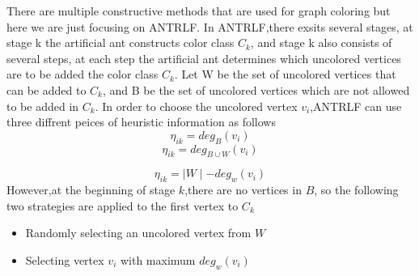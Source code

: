 \documentclass[a4paper]{article}
\begin{document}
There are multiple constructive methods that are used for graph coloring but here we are just focusing on ANTRLF. In ANTRLF,there exsits several stages, at stage k the artificial ant constructs color class $C_k$, and stage k also consists of several steps, at each step the artificial ant determines which uncolored vertices are to be added the color class $C_k$. Let W be the set of uncolored vertices that can be added to $C_k$, and B be the set 
of uncolored vertices which are not allowed to be added in $C_k$. In order to choose the uncolored vertex $v_i$,ANTRLF can use three diffrent peices of heuristic information as follows
\begin{equation}
\eta_{ik} = deg_{B}(v_i)  
\label{eqn:strat1}  
\end{equation}
\begin{equation}
    \eta_{ik} = deg_{B \cup W}(v_i)
    \label{eqn:strat2}    
\end{equation}

\begin{equation}
    \eta_{ik} = \mid W \mid  - deg_{w}(v_i)
    \label{eqn:strat3}    
\end{equation}
However,at the beginning of stage $k$,there are no vertices in $B$, so the following two strategies are applied to the first vertex to $C_k$
\begin{itemize}
    \item Randomly selecting an uncolored vertex from $W$
    \item Selecting vertex $v_i$ with maximum $deg_{w} (v_i)$
\end{itemize}
\end{document}
